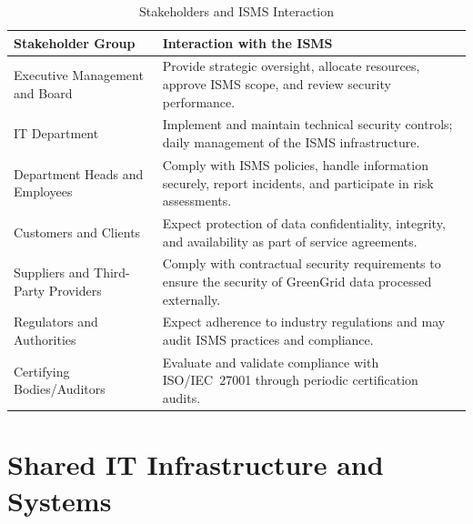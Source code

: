 \begin{table}[ht]
    \centering
    \caption{Stakeholders and \ac{ISMS} Interaction}
    \label{tab:stakeholders}
    \begin{tabular}{|p{5cm}|p{9cm}|}
        \hline
        \textbf{Stakeholder Group} & \textbf{Interaction with the \ac{ISMS}} \\ \hline
        Executive Management
        and Board                  &
        Provide strategic oversight, allocate resources, approve \ac{ISMS} scope,
        and review security performance.                                     \\ \hline
        \ac{IT} Department         &
        Implement and maintain technical security controls; daily management of
        the \ac{ISMS} infrastructure.                                        \\ \hline
        Department Heads
        and Employees              &
        Comply with \ac{ISMS} policies, handle information securely, report incidents,
        and participate in risk assessments.                                 \\ \hline
        Customers
        and Clients                &
        Expect protection of data confidentiality, integrity, and availability
        as part of service agreements.                                       \\ \hline
        Suppliers and
        Third-Party Providers      &
        Comply with contractual security requirements to ensure the security
        of GreenGrid data processed externally.                              \\ \hline
        Regulators
        and Authorities            &
        Expect adherence to industry regulations and may audit \ac{ISMS} practices
        and compliance.                                                      \\ \hline
        Certifying
        Bodies/Auditors            &
        Evaluate and validate compliance with ISO/IEC~27001 through periodic
        certification audits.                                                \\ \hline
    \end{tabular}
\end{table}

\section{Shared IT Infrastructure and Systems}
\label{sec:shared_it}

